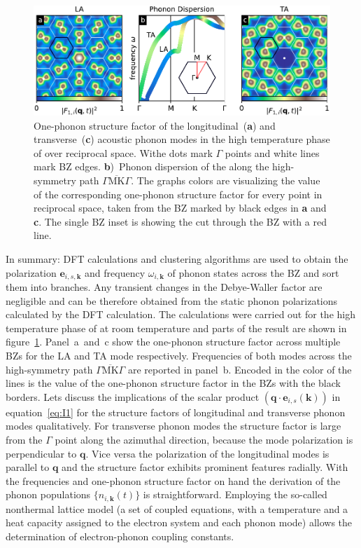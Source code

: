 \begin{figure}[!t]
	\includegraphics[width=\columnwidth]{figs/ops.pdf}
	\caption{One-phonon structure factor of the longitudinal~(\textbf{a}) and transverse~(\textbf{c}) acoustic phonon modes in the high temperature phase of \ts over reciprocal space. Withe dots mark $\Gamma$ points and white lines mark \ac{BZ} edges. \textbf{b})~Phonon dispersion of the along the high-symmetry path $\overline{\Gamma\mathrm{MK}\Gamma}$. The graphs colors are visualizing the value of the corresponding one-phonon structure factor for every point in reciprocal space, taken from the \ac{BZ} marked by black edges in \textbf{a} and \textbf{c}. The single \ac{BZ} inset is showing the cut through the \ac{BZ} with a red line.}
	\label{fig:ops}
\end{figure}

In summary: \Ac{DFT} calculations and clustering algorithms are used to obtain the polarization $\mathbf{e}_{i,s,\mathbf{k}}$ and frequency $\omega_{i,\mathbf{k}}$ of phonon states across the \ac{BZ} and sort them into branches.
Any transient changes in the Debye-Waller factor are negligible and can be therefore obtained from the static phonon polarizations calculated by the \ac{DFT} calculation.
The calculations were carried out for the high temperature phase of \ts at room temperature and parts of the result are shown in figure~\ref{fig:ops}.
Panel~a~and~c show the one-phonon structure factor across multiple \acp{BZ} for the \ac{LA} and \ac{TA} mode respectively.
Frequencies of both modes across the high-symmetry path $\overline{\Gamma\mathrm{MK}\Gamma}$ are reported in panel~b.
Encoded in the color of the lines is the value of the one-phonon structure factor in the \acp{BZ} with the black borders.
Lets discuss the implications of the scalar product $\left( \mathbf{q}\cdot\mathbf{e}_{i, s}(\mathbf{k}) \right)$ in equation~\ref{eq:I1} for the structure factors of longitudinal and transverse phonon modes qualitatively.
For transverse phonon modes the structure factor is large from the $\Gamma$ point along the azimuthal direction, because the mode polarization is perpendicular to $\mathbf{q}$.
Vice versa the polarization of the longitudinal modes is parallel to $\mathbf{q}$ and the structure factor exhibits prominent features radially.
With the frequencies and one-phonon structure factor on hand the derivation of the phonon populations $\{n_{i,\mathbf{k}}(t)\}$ is straightforward.
Employing the so-called nonthermal lattice model\cite{waldecker2016} (a set of coupled equations, with a temperature and a heat capacity assigned to the electron system and each phonon mode) allows the determination of electron-phonon coupling constants.

